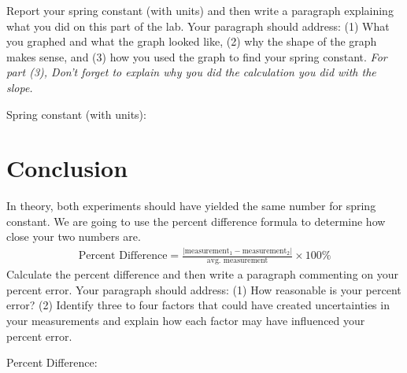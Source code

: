 \documentclass[10pt]{exam}
\begin{document}
\noindent
Report your spring constant (with units) and then write a paragraph explaining what you did on this part of the lab.  Your paragraph should address: (1) What you graphed and what the graph looked like, (2) why the shape of the graph makes sense, and (3) how you used the graph to find your spring constant.  \emph{For part (3), Don't forget to explain why you did the calculation you did with the slope.}

\vspace{1em}

Spring constant (with units): \fillin[][15em]

\vs


\section*{Conclusion}

In theory, both experiments should have yielded the same number for spring constant.  We are going to use the percent difference formula to determine how close your two numbers are.
%
\begin{align*}
  \text{Percent Difference} = \frac{\left| \text{measurement}_1 - \text{measurement}_2  \right|}{\text{avg. measurement}} \times 100\%
\end{align*}
%
Calculate the percent difference and then write a paragraph commenting on your percent error.  Your paragraph should address: (1) How reasonable is your percent error? (2) Identify three to four factors that could have created uncertainties in your measurements and explain how each factor may have influenced your percent error.


\vspace{1em}

Percent Difference: \fillin[][15em]

\vs[3]
\end{document}
